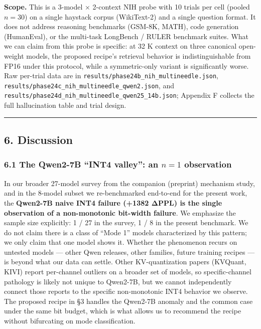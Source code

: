 \documentclass[
]{article}
\begin{document}
\textbf{Scope.} This is a 3-model × 2-context NIH probe with 10 trials
per cell (pooled \(n = 30\)) on a single haystack corpus (WikiText-2)
and a single question format. It does not address reasoning benchmarks
(GSM-8K, MATH), code generation (HumanEval), or the multi-task LongBench
/ RULER benchmark suites. What we can claim from this probe is specific:
at 32 K context on three canonical open-weight models, the proposed
recipe's retrieval behavior is indistinguishable from FP16 under this
protocol, while a symmetric-only variant is significantly worse. Raw
per-trial data are in \texttt{results/phase24b\_nih\_multineedle.json},
\texttt{results/phase24c\_nih\_multineedle\_qwen2.json}, and
\texttt{results/phase24d\_nih\_multineedle\_qwen25\_14b.json}; Appendix
F collects the full hallucination table and trial design.

\begin{center}\rule{0.5\linewidth}{0.5pt}\end{center}

\subsection{6. Discussion}\label{discussion}

\subsubsection{\texorpdfstring{6.1 The Qwen2-7B ``INT4 valley'': an
\(n = 1\)
observation}{6.1 The Qwen2-7B ``INT4 valley'': an n = 1 observation}}\label{the-qwen2-7b-int4-valley-an-n-1-observation}

In our broader 27-model survey from the companion (preprint) mechanism
study, and in the 8-model subset we re-benchmarked end-to-end for the
present work, the \textbf{Qwen2-7B naive INT4 failure (+1382 ΔPPL) is
the single observation of a non-monotonic bit-width failure}. We
emphasize the sample size explicitly: 1 / 27 in the survey, 1 / 8 in the
present benchmark. We do not claim there is a class of ``Mode 1'' models
characterized by this pattern; we only claim that one model shows it.
Whether the phenomenon recurs on untested models --- other Qwen
releases, other families, future training recipes --- is beyond what our
data can settle. Other KV-quantization papers (KVQuant, KIVI) report
per-channel outliers on a broader set of models, so specific-channel
pathology is likely not unique to Qwen2-7B, but we cannot independently
connect those reports to the specific non-monotonic INT4 behavior we
observe. The proposed recipe in §3 handles the Qwen2-7B anomaly and the
common case under the same bit budget, which is what allows us to
recommend the recipe without bifurcating on mode classification.
\end{document}

